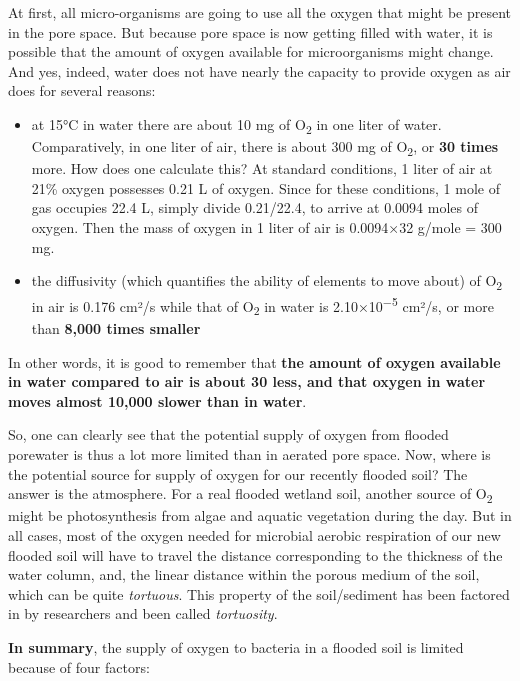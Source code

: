 \documentclass[]{book}
\providecommand{\tightlist}{%
  \setlength{\itemsep}{0pt}\setlength{\parskip}{0pt}}
\theoremstyle{definition}
\theoremstyle{definition}
\theoremstyle{definition}
\theoremstyle{remark}
\begin{document}
At first, all micro-organisms are going to use all the oxygen that might
be present in the pore space. But because pore space is now getting
filled with water, it is possible that the amount of oxygen available
for microorganisms might change. And yes, indeed, water does not have
nearly the capacity to provide oxygen as air does for several reasons:

\begin{itemize}
\tightlist
\item
  at 15°C in water there are about 10 mg of O\textsubscript{2} in one
  liter of water. Comparatively, in one liter of air, there is about 300
  mg of O\textsubscript{2}, or \textbf{30 times} more. How does one
  calculate this? At standard conditions, 1 liter of air at 21\% oxygen
  possesses 0.21 L of oxygen. Since for these conditions, 1 mole of gas
  occupies 22.4 L, simply divide 0.21/22.4, to arrive at 0.0094 moles of
  oxygen. Then the mass of oxygen in 1 liter of air is 0.0094×32 g/mole
  = 300 mg.
\item
  the diffusivity (which quantifies the ability of elements to move
  about) of O\textsubscript{2} in air is 0.176 cm²/s while that of
  O\textsubscript{2} in water is 2.10×10\textsuperscript{−5} cm²/s, or
  more than \textbf{8,000 times smaller}
  \citep{Wikipedia_contributors2017-id}
\end{itemize}

In other words, it is good to remember that \textbf{the amount of oxygen
available in water compared to air is about 30 less, and that oxygen in
water moves almost 10,000 slower than in water}.

So, one can clearly see that the potential supply of oxygen from flooded
porewater is thus a lot more limited than in aerated pore space. Now,
where is the potential source for supply of oxygen for our recently
flooded soil? The answer is the atmosphere. For a real flooded wetland
soil, another source of O\textsubscript{2} might be photosynthesis from
algae and aquatic vegetation during the day. But in all cases, most of
the oxygen needed for microbial aerobic respiration of our new flooded
soil will have to travel the distance corresponding to the thickness of
the water column, and, the linear distance within the porous medium of
the soil, which can be quite \emph{tortuous}. This property of the
soil/sediment has been factored in by researchers and been called
\emph{tortuosity}.

\textbf{In summary}, the supply of oxygen to bacteria in a flooded soil
is limited because of four factors:
\end{document}
